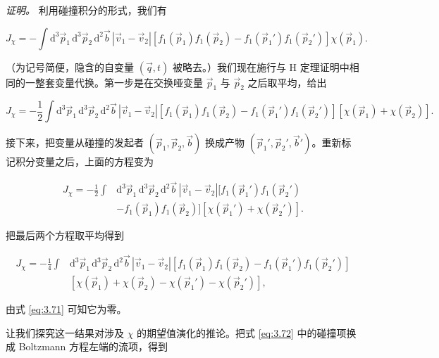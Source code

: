 \emph{证明。} 利用碰撞积分的形式，我们有

\begin{equation}\label{eq:3.73}
  J_\chi=-\int \mathrm{d}^3\vec p_1\,\mathrm{d}^3\vec p_2\,\mathrm{d}^2\vec b\,|\vec v_1-\vec v_2|\left[f_1(\vec p_1)f_1(\vec p_2)-f_1(\vec p_1{}')f_1(\vec p_2{}')\right]\chi(\vec p_1).
\end{equation}

（为记号简便，隐含的自变量 $(\vec q,t)$ 被略去。）我们现在施行与 H 定理证明中相同的一整套变量代换。第一步是在交换哑变量 $\vec p_1$ 与 $\vec p_2$ 之后取平均，给出

\begin{equation}\label{eq:3.74}
  J_\chi=-\frac{1}{2}\int \mathrm{d}^3\vec p_1\,\mathrm{d}^3\vec p_2\,\mathrm{d}^2\vec b\,|\vec v_1-\vec v_2|\left[f_1(\vec p_1)f_1(\vec p_2)-f_1(\vec p_1{}')f_1(\vec p_2{}')\right]\left[\chi(\vec p_1)+\chi(\vec p_2)\right].
\end{equation}

接下来，把变量从碰撞的发起者 $(\vec p_1,\vec p_2,\vec b)$ 换成产物 $(\vec p_1',\vec p_2',\vec b')$。重新标记积分变量之后，上面的方程变为

\begin{equation}\label{eq:3.75}
  \begin{aligned}
    J_\chi=-\frac{1}{2}\int &\mathrm{d}^3\vec p_1\,\mathrm{d}^3\vec p_2\,\mathrm{d}^2\vec b\,|\vec v_1-\vec v_2|\Big[f_1(\vec p_1{}')f_1(\vec p_2{}')\\
    &-f_1(\vec p_1)f_1(\vec p_2)\Big]\left[\chi(\vec p_1{}')+\chi(\vec p_2{}')\right].
  \end{aligned}
\end{equation}

把最后两个方程取平均得到

\begin{equation}\label{eq:3.76}
  \begin{aligned}
    J_\chi=-\frac{1}{4}\int &\mathrm{d}^3\vec p_1\,\mathrm{d}^3\vec p_2\,\mathrm{d}^2\vec b\,|\vec v_1-\vec v_2|\left[f_1(\vec p_1)f_1(\vec p_2)-f_1(\vec p_1{}')f_1(\vec p_2{}')\right]\\
    &\left[\chi(\vec p_1)+\chi(\vec p_2)-\chi(\vec p_1{}')-\chi(\vec p_2{}')\right],
  \end{aligned}
\end{equation}

由式 \eqref{eq:3.71} 可知它为零。

让我们探究这一结果对涉及 $\chi$ 的期望值演化的推论。把式 \eqref{eq:3.72} 中的碰撞项换成 Boltzmann 方程左端的流项，得到

